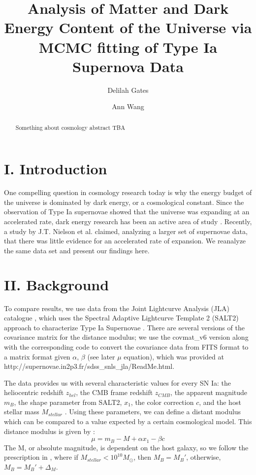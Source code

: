 \documentclass[aps,prl,reprint]{revtex4-1}
\begin{document}

\title{	Analysis of Matter and Dark Energy Content of the Universe via MCMC fitting of Type Ia Supernova Data}
\author{Delilah Gates}
\author{Ann Wang}
\begin{abstract}
Something about cosmology abstract TBA
\end{abstract}
\maketitle
\section{I. Introduction}
One compelling question in cosmology research today is why the energy budget of the universe is dominated by dark energy, or a cosmological constant. Since the observation of Type Ia supernovae showed that the universe was expanding at an accelerated rate, dark energy research has been an active area of study \cite{riess_sn}. Recently, a study by J.T. Nielson et al. \cite{shocker} claimed, analyzing a larger set of supernovae data, that there was little evidence for an accelerated rate of expansion. We reanalyze the same data set and present our findings here.
\section{II. Background}
To compare results, we use data from the Joint Lightcurve Analysis (JLA) catalogue \cite{sdss}, which uses the Spectral Adaptive Lightcurve Template 2 (SALT2) approach to characterize Type Ia Supernovae \cite{salt2}. There are several versions of the covariance matrix for the distance modulus; we use the covmat\_v6 version along with the corresponding code to convert the covariance data from FITS format \cite{fits} to a matrix format given $\alpha$, $\beta$ (see later $\mu$ equation), which was provided at http://supernovae.in2p3.fr/sdss\_snls\_jla/ReadMe.html. 
\par The data provides us with several characteristic values for every SN Ia: the heliocentric redshift $z_{hel}$, the CMB frame redshift $z_{CMB}$, the apparent magnitude $m_B$, the shape parameter from SALT2, $x_1$, the color correction $c$, and the host stellar mass $M_{stellar}$ \cite{sdss}. Using these parameters, we can define a distant modulus which can be compared to a value expected by a certain cosmological model. This distance modulus is given by \cite{sdss}: 
\begin{equation}
\mu = m_B - M + \alpha x_1 - \beta c
\end{equation}
The M, or absolute magnitude, is dependent on the host galaxy, so we follow the prescription in \cite{sdss}, where if $M_{stellar} < 10^{10} M_{\odot}$, then $M_B = M_B'$, otherwise, $M_B = M_B' + \Delta_M$. 
\end{document}
